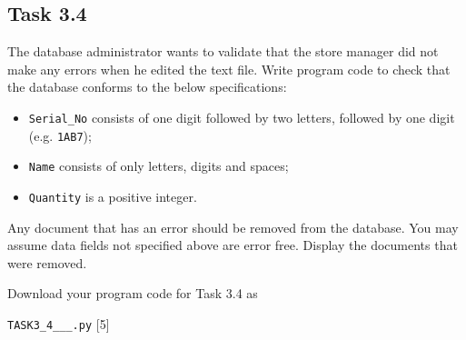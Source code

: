 \subsection*{Task 3.4}

The database administrator wants to validate that the store manager
did not make any errors when he edited the text file. Write program
code to check that the database conforms to the below specifications:
\begin{itemize}
\item \texttt{Serial\_No} consists of one digit followed by two letters,
followed by one digit (e.g. \texttt{1AB7}); 
\item \texttt{Name} consists of only letters, digits and spaces; 
\item \texttt{Quantity} is a positive integer. 
\end{itemize}
Any document that has an error should be removed from the database.
You may assume data fields not specified above are error free. Display
the documents that were removed.

Download your program code for Task 3.4 as 

\texttt{TASK3\_4\_<your name>\_<centre number>\_<index number>.py}
\hfill{}{[}5{]}